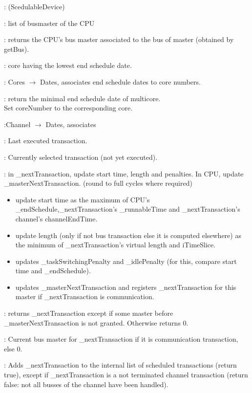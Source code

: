 \documentclass[a4paper,11pt]{article}
\newcommand{\bfont}{\fontseries{b}\selectfont}
\newcommand{\cod}[1]{{\ttfamily #1}}
\newcommand{\class}[2]{\par\vspace{1mm}\hspace{-5mm}\large\colorbox{file}{\textbullet\bfont\cod{#1}:} (\cod{#2})\par}
\newcommand{\method}[1]{\par\vspace{1mm}\hspace{-2mm}\colorbox{method}{\textopenbullet\bfont\cod{#1}:}}
\newcommand{\variable}[1]{\par\vspace{1mm}\hspace{-2mm}\colorbox{variable}{\textopenbullet\bfont\cod{#1}:}}
\begin{document}
\class{MultiCoreCPU}{ScedulableDevice}

\variable{\_busMasterList} list of busmaster of the CPU

\method{getMasterForBus(master)} returns the CPU's bus master associated to the bus of master (obtained by getBus).
\variable{coreNumber} core having the lowest end schedule date.

\variable{multicore} {\ttfamily Cores $\rightarrow$ Dates}, associates end schedule dates to core numbers.

\method{getMinEndSchedule} return the minimal end schedule date of \cod{multicore}.\\ Set \cod{coreNumber} to the corresponding core.

\variable{channelEndTime}{\ttfamily Channel $\rightarrow$ Dates}, associates

\variable{\_lastTransaction} Last executed transaction.

\variable{\_nextTransaction} Currently selected transaction (not yet executed).

\method{calcStartTimeLength(iTimeSlice)} in \cod{\_nextTransaction}, update start time, length and penalties. In CPU, update \cod{\_masterNextTransaction}. (round to full cycles where required)
\begin{itemize}
	\item update start time as the maximum of CPU's \cod{\_endSchedule},\cod{\_nextTransaction}'s \cod{\_runnableTime} and \cod{\_nextTransaction}'s channel's \cod{channelEndTime}.
	\item update length (only if not bus transaction else it is computed elsewhere) as the minimum of \cod{\_nextTransaction}'s virtual length and \cod{iTimeSlice}.
	\item updates \cod{\_taskSwitchingPenalty} and \cod{\_idlePenalty} (for this, compare start time and \cod{\_endSchedule}).
	\item updates \cod{\_masterNextTransaction} and registers \cod{\_nextTransaction} for this master if \cod{\_nextTransaction} is communication. 
\end{itemize}

\method{getNextTransaction} returns \cod{\_nextTransaction} except if some master before \cod{\_mas\-terNextTransaction} is not granted. Otherwise returns 0.
\variable{\_masterNextTransaction} Current bus master for \cod{\_nextTransaction} if it is communication transaction, else 0.
\method{addTransaction} Adds \cod{\_nextTransaction} to the internal list of scheduled transactions (return true), except if \cod{\_nextTransaction} is a not terminated channel transaction (return false: not all busses of the channel have been handled).
\end{document}
